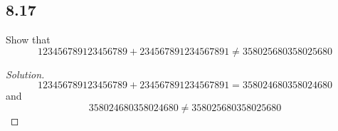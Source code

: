 \documentclass[]{article}
\newcommand\<{\langle}
\renewcommand\>{\rangle}
\newenvironment{solution}
{
	\begin{proof}[Solution] \text{ }
		\\
	}
	{
	\end{proof}
}
\begin{document}
\subsection*{8.17} Show that
$$
	123456789123456789 + 234567891234567891 \neq 358025680358025680
$$
\begin{solution}
	$$
		123456789123456789 + 234567891234567891 = 358024680358024680
	$$
	and 
	$$
		358024680358024680 \neq 358025680358025680
	$$
\end{solution}
\end{document}
